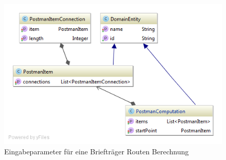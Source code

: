 \begin{figure}[h]
\centering
\includegraphics[scale=0.5]{images/probleme/postman.png}
\caption[Eingabeparameter für eine Briefträger Routen Berechnung]{Eingabeparameter für eine Briefträger Routen Berechnung \selfmade{}}
\label{fig:postman_input}
\end{figure}

%
%
%
%

